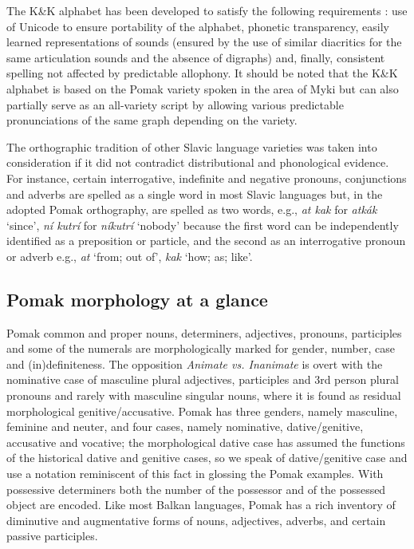 \documentclass[output=paper,colorlinks,citecolor=brown]{langscibook}
\begin{document}
The K\&K alphabet has been developed to satisfy the following requirements \citep{karahoga-morphologically}:  use of Unicode to ensure portability of the alphabet, phonetic transparency, easily learned representations of sounds (ensured by the use of similar diacritics for the same articulation sounds and the absence of digraphs) and, finally, consistent spelling not affected by predictable allophony. It should be noted that the K\&K alphabet is based on the Pomak variety spoken in the area of Myki but can also partially serve as an all-variety script by allowing various predictable pronunciations of the same graph depending on the variety.


The orthographic tradition of other Slavic language varieties was taken into consideration if it did not contradict distributional and phonological evidence. For instance,   certain interrogative, indefinite and negative pronouns, conjunctions and adverbs are spelled as a single word in most Slavic languages but, in the adopted Pomak orthography,  are spelled as two words, e.g., \textit{at kak} for \textit{atkák} `since’, \textit{ní kutrí} for \textit{níkutrí} ‘nobody' because the first word can be independently identified as a preposition or particle, and the second as an interrogative pronoun or adverb e.g., \textit{at} ‘from; out of’, \textit{kak} ‘how; as; like’.

\subsection{Pomak morphology at a glance}
\label{sec:morphology}

Pomak common and proper nouns, determiners, adjectives, pronouns, participles and some of the numerals are morphologically marked for gender, number, case and (in)definiteness. The opposition \textit{Animate vs. Inanimate} is overt with the nominative case of masculine plural adjectives, participles and 3rd person plural pronouns and rarely with masculine singular nouns, where it is found as residual morphological genitive/accusative. Pomak has three genders, namely masculine, feminine and neuter, and four cases, namely nominative, dative/genitive, accusative and vocative; the morphological dative case has assumed the functions of the historical dative and genitive cases, so we speak of dative/genitive case and use a notation reminiscent of this fact in glossing the Pomak examples.   With possessive determiners both the number of the possessor and of the possessed object are encoded. Like most Balkan languages, Pomak has a rich inventory of diminutive and augmentative forms of nouns, adjectives, adverbs, and certain passive participles.
\end{document}
